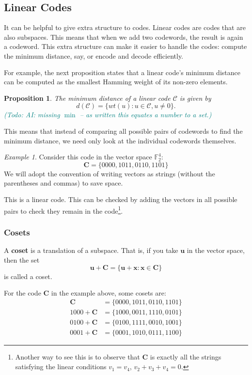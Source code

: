 \documentclass{article}
\theoremstyle{plain}
\newtheorem{proposition}[theorem]{Proposition}
\theoremstyle{definition}
\theoremstyle{remark}
\newtheorem{example}[theorem]{Example}
\numberwithin{theorem}{section}
\newcommand{\todo}[1]{\textcolor{teal}{{\sf (Todo:} {\sl{#1})}}}
\newcommand{\todo}[1]{}
\newcommand{\FF}{\mathbb{F}}
\begin{document}
\subsection{Linear Codes}

It can be helpful to give extra structure to codes.  Linear codes are codes that are also subspaces.  This means that when we add two codewords, the result is again a codeword.  This extra structure can make it easier to handle the codes:  compute the minimum distance, say, or encode and decode efficiently.

For example, the next proposition states that a linear code's minimum distance can be computed as the smallest Hamming weight of its non-zero elements.

\begin{proposition}
    The minimum distance of a linear code $\mathcal{C}$ is given by
    \[
    d(\mathcal{C}) = \{ wt(u) : u \in \mathcal{C}, u \neq 0\}.
    \]
    \todo{AI: missing $\min$ -- as written this equates a number to a set.}
\end{proposition}

This means that instead of comparing all possible pairs of codewords to find the minimum distance, we need only look at the individual codewords themselves.

\begin{example}
Consider this code in the vector space $\FF_2^4$:
\[
\mathbf{C} = \{ 0000, 1011, 0110, 1101 \}
\]
We will adopt the convention of writing vectors as strings (without the parentheses and commas) to save space.

This is a linear code.  This can be checked by adding the vectors in all possible pairs to check they remain in the code\footnote{Another way to see this is to observe that $\mathbf{C}$ is exactly all the strings satisfying the linear conditions $v_1 = v_4$, $v_2+v_3+v_4 = 0$.}.
\end{example}

\subsubsection{Cosets}

A \textbf{coset} is a translation of a subspace.  That is, if you take $\mathbf{u}$ in the vector space, then the set
\[
\mathbf{u} + \mathbf{C} = \{ \mathbf{u} + \mathbf{x} : \mathbf{x} \in \mathbf{C} \}
\]
is called a coset.

For the code $\mathbf{C}$ in the example above, some cosets are:
\begin{align*}
     \mathbf{C} &= \{ 0000, 1011, 0110, 1101 \} \\
     1000+\mathbf{C} &= \{ 1000, 0011, 1110, 0101 \} \\
     0100+\mathbf{C} &= \{ 0100, 1111, 0010, 1001 \} \\
     0001+\mathbf{C} &= \{ 0001, 1010, 0111, 1100 \} 
\end{align*}
\end{document}
